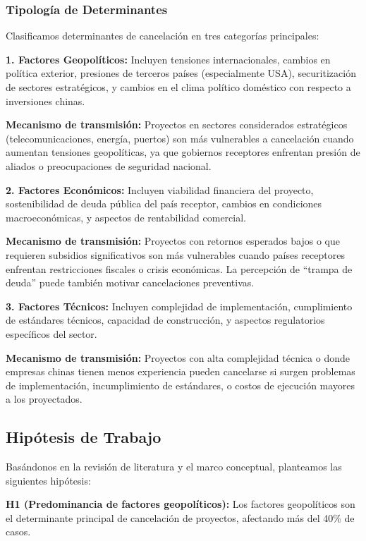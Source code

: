 \documentclass[12pt]{article}
\begin{document}
\subsubsection{Tipología de Determinantes}

Clasificamos determinantes de cancelación en tres categorías principales:

\textbf{1. Factores Geopolíticos:} Incluyen tensiones internacionales, cambios en política exterior, presiones de terceros países (especialmente USA), securitización de sectores estratégicos, y cambios en el clima político doméstico con respecto a inversiones chinas.

\textbf{Mecanismo de transmisión:} Proyectos en sectores considerados estratégicos (telecomunicaciones, energía, puertos) son más vulnerables a cancelación cuando aumentan tensiones geopolíticas, ya que gobiernos receptores enfrentan presión de aliados o preocupaciones de seguridad nacional.

\textbf{2. Factores Económicos:} Incluyen viabilidad financiera del proyecto, sostenibilidad de deuda pública del país receptor, cambios en condiciones macroeconómicas, y aspectos de rentabilidad comercial.

\textbf{Mecanismo de transmisión:} Proyectos con retornos esperados bajos o que requieren subsidios significativos son más vulnerables cuando países receptores enfrentan restricciones fiscales o crisis económicas. La percepción de ``trampa de deuda'' puede también motivar cancelaciones preventivas.

\textbf{3. Factores Técnicos:} Incluyen complejidad de implementación, cumplimiento de estándares técnicos, capacidad de construcción, y aspectos regulatorios específicos del sector.

\textbf{Mecanismo de transmisión:} Proyectos con alta complejidad técnica o donde empresas chinas tienen menos experiencia pueden cancelarse si surgen problemas de implementación, incumplimiento de estándares, o costos de ejecución mayores a los proyectados.

\subsection{Hipótesis de Trabajo}

Basándonos en la revisión de literatura y el marco conceptual, planteamos las siguientes hipótesis:

\textbf{H1 (Predominancia de factores geopolíticos):} Los factores geopolíticos son el determinante principal de cancelación de proyectos, afectando más del 40\% de casos.
\end{document}
